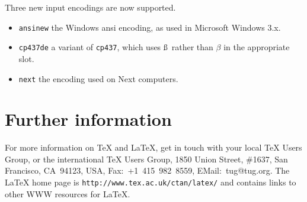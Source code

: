 \documentclass{ltnews}
\providecommand\option[1]{\texttt{#1}}
\begin{document}
Three new input encodings are now supported.
\begin{itemize}
\item \option{ansinew} the Windows ansi encoding,
                       as used in Microsoft Windows 3.x.
\item \option{cp437de} a variant of \option{cp437}, which uses \ss\
  rather than $\beta$  in the appropriate slot.
\item \option{next} the encoding used on Next computers.
\end{itemize}

\section{Further information}

For more information on \TeX{} and \LaTeX, get in touch with your local
\TeX{} Users Group, or the international \TeX{} Users Group,
1850 Union Street, \#1637, San Francisco, CA~94123, USA,
Fax:~+1~415~982~8559,
EMail:~tug@tug.org.
The \LaTeX{} home page is \verb|http://www.tex.ac.uk/ctan/latex/|
and contains links to other WWW resources for \LaTeX.
\end{document}
